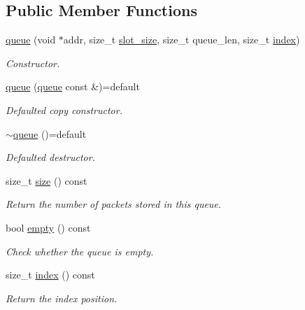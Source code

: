 \subsection*{Public Member Functions}
\begin{DoxyCompactItemize}
\item 
\hyperlink{classpfq_1_1queue_ae22b5277f726ea9b39a4088128d3cc38}{queue} (void $\ast$addr, size\+\_\+t \hyperlink{classpfq_1_1queue_aa8ec2b1bd7c4fb2ec924f356c95b81ae}{slot\+\_\+size}, size\+\_\+t queue\+\_\+len, size\+\_\+t \hyperlink{classpfq_1_1queue_a6eec9332ce5248055b03376855469087}{index})
\begin{DoxyCompactList}\small\item\em Constructor. \end{DoxyCompactList}\item 
\hyperlink{classpfq_1_1queue_a63fb6cb036b494997edceace28b4dfac}{queue} (\hyperlink{classpfq_1_1queue}{queue} const \&)=default
\begin{DoxyCompactList}\small\item\em Defaulted copy constructor. \end{DoxyCompactList}\item 
\hyperlink{classpfq_1_1queue_a2605dcaac04245b5316262a4cf7cd1c0}{$\sim$queue} ()=default
\begin{DoxyCompactList}\small\item\em Defaulted destructor. \end{DoxyCompactList}\item 
size\+\_\+t \hyperlink{classpfq_1_1queue_a367fd68b05da07a1d95f91b8d2ae9990}{size} () const 
\begin{DoxyCompactList}\small\item\em Return the number of packets stored in this queue. \end{DoxyCompactList}\item 
bool \hyperlink{classpfq_1_1queue_ade52977341756f260e8e9f18c0b7b5c5}{empty} () const 
\begin{DoxyCompactList}\small\item\em Check whether the queue is empty. \end{DoxyCompactList}\item 
size\+\_\+t \hyperlink{classpfq_1_1queue_a6eec9332ce5248055b03376855469087}{index} () const 
\begin{DoxyCompactList}\small\item\em Return the index position. \end{DoxyCompactList}\item 

\end{DoxyCompactItemize}
